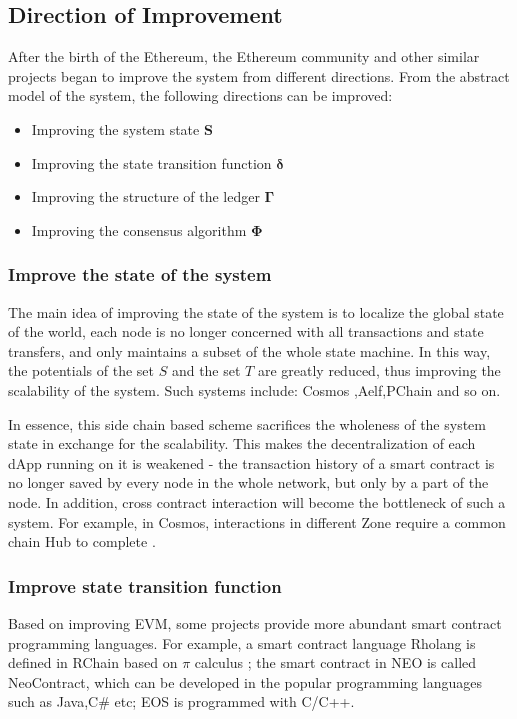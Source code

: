\documentclass[UTF8,nofonts]{article}
\begin{document}
\begin{multicols}{2}
\subsection{Direction of Improvement}
After the birth of the Ethereum, the Ethereum community and other similar projects began to improve the system from different directions.  From the abstract model of the system, the following directions can be improved:
\begin{itemize}
	\item Improving the system state  $\boldsymbol{S}$	
	\item Improving the state transition function $\boldsymbol{\delta}$	
	\item Improving the structure of the ledger $\boldsymbol{\Gamma}$
	\item Improving the consensus algorithm $\boldsymbol{\Phi}$
\end{itemize}

\subsubsection{Improve the state of the system}
The main idea of improving the state of the system is to localize the global state of the world, each node is no longer concerned with all transactions and state transfers, and only maintains a subset of the whole state machine. In this way, the potentials of the set $S$ and the set $T$ are greatly reduced, thus improving the scalability of the system. Such systems include: Cosmos \cite{cosmos},Aelf\cite{aelf},PChain and so on.

In essence, this side chain based scheme sacrifices the wholeness of the system state in exchange for the scalability. This makes the decentralization of each dApp running on it is weakened - the transaction history of a smart contract is no longer saved by every node in the whole network, but only by a part of the node. In addition, cross contract interaction will become the bottleneck of such a system. For example, in Cosmos, interactions in different Zone require a common chain Hub to complete \cite{cosmos}.

\subsubsection{Improve state transition function}
Based on improving EVM, some projects provide more abundant smart contract programming languages. For example, a smart contract language Rholang is defined in RChain based on $\pi$ calculus ; the smart contract in NEO is called NeoContract, which can be developed in the popular programming languages such as Java,C\# etc; EOS is programmed with C/C++.


\end{multicols}
\end{document}
